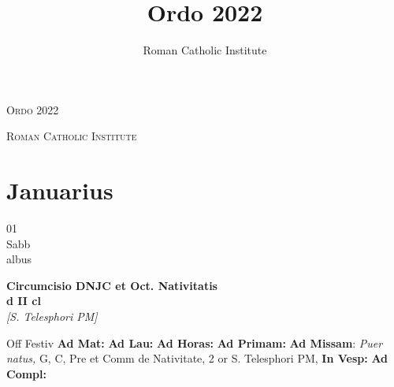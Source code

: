 \documentclass[10pt, openany]{book}
\title{Ordo 2022}
\author{Roman Catholic Institute}
\begin{document}
        \begin{titlepage}
            \begin{center}
                {\fontsize{50}{60}\selectfont \textsc{Ordo 2022}}
            \end{center}
            \begin{center}
                {\footnotesize \textsc{Roman Catholic Institute}}
            \end{center}
        \end{titlepage}
        \clearpage\begingroup\pagestyle{empty}\cleardoublepage\endgroup
    
        \chapter{Januarius}
                        
        \begin{center}
            \begin{minipage}{3.5in}
                \vspace{2em}
                \begin{minipage}{0.5in}
                    {\Huge 01} \\
                    {\normalsize Sabb} \\
                    {\normalsize albus}
                \end{minipage}
                \begin{minipage}{3.0in}
                    \textbf{ \large Circumcisio DNJC et Oct. Nativitatis \\
                    \textnormal{\normalsize d II cl}} \\ \textit{[S. Telesphori PM]} \\ 
                \end{minipage}
                \begin{justify}Off Festiv
                    \textbf{Ad Mat: }
                    \textbf{Ad Lau: }
                    \textbf{Ad Horas: }
                    \textbf{Ad Primam: }\textbf{Ad Missam}: \textit{Puer natus,} G, C, Pre et Comm de Nativitate, 2 or S. Telesphori PM,  
                    \textbf{In Vesp: }
                    \textbf{Ad Compl: }
                \end{justify}
            \end{minipage}
        \end{center}
    
\end{document}
